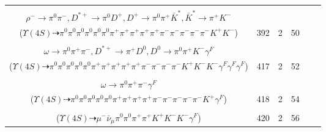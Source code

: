 \documentclass[landscape]{article}
\newcounter{rownumbers}
\newcommand\rn{\stepcounter{rownumbers}\arabic{rownumbers}}
\newcommand{\EOLP}{\\ \hline} %
\newcommand{\topoTags}[1]{#1} %
\begin{document}
\begin{longtable}{clcccc}
\rn & \makecell[l]{ $ 
\Upsilon(4S) \rightarrow B^{0} \bar{B}^{0} ,
B^{0} \rightarrow \rho^{+} D^{-} ,
\bar{B}^{0} \rightarrow \pi^{0} \pi^{+} \pi^{-} \pi^{-} \rho^{+} \rho^{-} D^{*+} ,
\rho^{+} \rightarrow \pi^{0} \pi^{+} ,
D^{-} \rightarrow \pi^{-} \pi^{-} K^{+} ,
\rho^{+} \rightarrow \pi^{0} \pi^{+} ,
$ \\ $
\rho^{-} \rightarrow \pi^{0} \pi^{-} ,
D^{*+} \rightarrow \pi^{0} D^{+} ,
D^{+} \rightarrow \pi^{0} \pi^{+} \bar{K}^{*} ,
\bar{K}^{*} \rightarrow \pi^{+} K^{-} 
$ \\ ($
\Upsilon(4S) \dashrightarrow \pi^{0} \pi^{0} \pi^{0} \pi^{0} \pi^{0} \pi^{0} \pi^{+} \pi^{+} \pi^{+} \pi^{+} \pi^{+} \pi^{-} \pi^{-} \pi^{-} \pi^{-} \pi^{-} K^{+} K^{-} 
$) } & \topoTags{392 & }2 & 50 \EOLP

\rn & \makecell[l]{ $ 
\Upsilon(4S) \rightarrow B^{0} \bar{B}^{0} ,
B^{0} \rightarrow \rho^{+} D^{-} ,
\bar{B}^{0} \rightarrow \pi^{0} \omega \omega K^{-} D^{*+} ,
\rho^{+} \rightarrow \pi^{0} \pi^{+} ,
D^{-} \rightarrow \pi^{-} \pi^{-} K^{+} \gamma^{F} \gamma^{F} ,
\omega \rightarrow \pi^{0} \pi^{+} \pi^{-} ,
$ \\ $
\omega \rightarrow \pi^{0} \pi^{+} \pi^{-} ,
D^{*+} \rightarrow \pi^{+} D^{0} ,
D^{0} \rightarrow \pi^{0} \pi^{+} K^{-} \gamma^{F} 
$ \\ ($
\Upsilon(4S) \dashrightarrow \pi^{0} \pi^{0} \pi^{0} \pi^{0} \pi^{0} \pi^{+} \pi^{+} \pi^{+} \pi^{+} \pi^{+} \pi^{-} \pi^{-} \pi^{-} \pi^{-} K^{+} K^{-} K^{-} \gamma^{F} \gamma^{F} \gamma^{F} 
$) } & \topoTags{417 & }2 & 52 \EOLP

\rn & \makecell[l]{ $ 
\Upsilon(4S) \rightarrow B^{0} \bar{B}^{0} ,
B^{0} \rightarrow \pi^{0} \pi^{-} K^{+} ,
\bar{B}^{0} \rightarrow \pi^{+} \pi^{-} D^{+} D_{s}^{-} ,
D^{+} \rightarrow \pi^{0} \pi^{+} \omega ,
D_{s}^{-} \rightarrow \pi^{0} \pi^{-} \omega ,
\omega \rightarrow \pi^{0} \pi^{+} \pi^{-} ,
$ \\ $
\omega \rightarrow \pi^{0} \pi^{+} \pi^{-} \gamma^{F} 
$ \\ ($
\Upsilon(4S) \dashrightarrow \pi^{0} \pi^{0} \pi^{0} \pi^{0} \pi^{0} \pi^{+} \pi^{+} \pi^{+} \pi^{+} \pi^{-} \pi^{-} \pi^{-} \pi^{-} \pi^{-} K^{+} \gamma^{F} 
$) } & \topoTags{418 & }2 & 54 \EOLP

\rn & \makecell[l]{ $ 
\Upsilon(4S) \rightarrow B^{0} \bar{B}^{0} ,
B^{0} \rightarrow \pi^{0} f_{0}(980) ,
\bar{B}^{0} \rightarrow \mu^{-} \bar{\nu}_{\mu} D^{*+} ,
f_{0}(980) \rightarrow K^{+} K^{-} \gamma^{F} ,
D^{*+} \rightarrow \pi^{+} D^{0} ,
D^{0} \rightarrow \pi^{0} \pi^{+} K^{-} 
$ \\ ($
\Upsilon(4S) \dashrightarrow \mu^{-} \bar{\nu}_{\mu} \pi^{0} \pi^{0} \pi^{+} \pi^{+} K^{+} K^{-} K^{-} \gamma^{F} 
$) } & \topoTags{420 & }2 & 56 \EOLP


\end{longtable}
\end{document}
